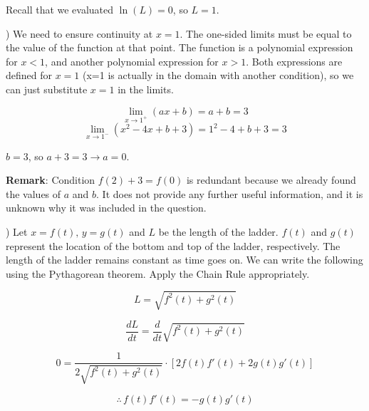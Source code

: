 \documentclass{article}
\begin{document}
\hfill

\noindent Recall that we evaluated $\ln(L) = 0$, so $\boxed{L = 1}$.

\hfill

) We need to ensure continuity at $x=1$. The one-sided limits must be equal to the value of the function at that point. The function is a polynomial expression for $x<1$, and another polynomial expression for $x>1$. Both expressions are defined for $x=1$ (x=1 is actually in the domain with another condition), so we can just substitute $x=1$ in the limits.

\begin{equation*}\lim_{x\to1^+} (ax+b) = a+b = 3\end{equation*}
\begin{equation*}\lim_{x\to1^-} (x^2-4x+b+3) = 1^2 -4 +b+3 =  3\end{equation*}

\noindent $\boxed{b=3}$, so $a+3 = 3\rightarrow \boxed{a = 0}$.

\hfill

\noindent \textbf{Remark}: Condition $f(2) + 3 = f(0)$ is redundant because we already found the values of $a$ and $b$. It does not provide any further useful information, and it is unknown why it was included in the question.

\hfill

) Let $x = f(t), \,y = g(t)$ and $L$ be the length of the ladder. $f(t)$ and $g(t)$ represent the location of the bottom and top of the ladder, respectively. The length of the ladder remains constant as time goes on. We can write the following using the Pythagorean theorem. Apply the Chain Rule appropriately.

\begin{equation*}L = \sqrt{f^2(t) + g^2(t)}\end{equation*}

\begin{equation*}\frac{dL}{dt} = \frac{d}{dt}\sqrt{f^2(t) + g^2(t)}\end{equation*}

\begin{equation*}0 = \frac{1}{2\sqrt{f^2(t)+g^2(t)}} \cdot [2f(t)f'(t) + 2g(t)g'(t)]\end{equation*}

\begin{equation}\therefore \, f(t)f'(t) = -g(t)g'(t)\end{equation}

\hfill
\end{document}
